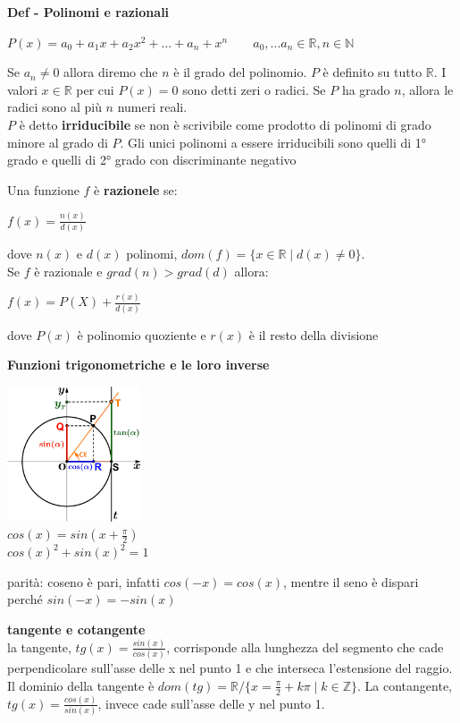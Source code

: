 \documentclass[12pt, a4paper]{article}
\begin{document}
    \textbf{Def - Polinomi e razionali}
    \begin{center}
        $P(x) = a_{0}+a_{1}x+a_{2}x^{2}+...+a_{n}+x^{n} \qquad a_{0},...a_{n}\in\mathbb{R},  n\in\mathbb{N}$
    \end{center}
    Se $a_{n}\neq 0$ allora diremo che $n$ è il grado del polinomio. $P$ è definito su tutto $\mathbb{R}$.
    I valori $x\in\mathbb{R}$ per cui $P(x)=0$ sono detti zeri o radici. Se $P$ ha grado $n$, allora le radici sono
    al più $n$ numeri reali.\\$P$ è detto \textbf{irriducibile} se non è scrivibile come prodotto di polinomi di grado
minore al grado di $P$. Gli unici polinomi a essere irriducibili sono quelli di 1° grado e quelli di 2° grado con
discriminante negativo

Una funzione $f$ è \textbf{razionele} se:
\begin{center}
    $f(x)=\frac{n(x)}{d(x)}$
\end{center}
dove $n(x)$ e $d(x)$ polinomi, $dom(f)=\{x\in\mathbb{R}\mid d(x)\neq 0\}$.\\Se $f$ è razionale e $grad(n)>grad(d)$
allora:
\begin{center}
    $f(x)=P(X)+\frac{r(x)}{d(x)}$
\end{center}
dove $P(x)$ è polinomio quoziente e $r(x)$ è il resto della divisione

\textbf{Funzioni trigonometriche e le loro inverse}
\begin{center}
    \includegraphics[width=150px]{images/trigon.png}\\
    $cos(x)=sin(x+\frac{\pi}{2})$\\
    $cos(x)^{2}+sin(x)^{2}=1$
\end{center}
parità: coseno è pari, infatti $cos(-x)=cos(x)$, mentre il seno è dispari perché $sin(-x)=-sin(x)$

\textbf{tangente e cotangente}\\la tangente, $tg(x)=\frac{sin(x)}{cos(x)}$, corrisponde alla lunghezza del segmento
che cade perpendicolare sull'asse delle x nel punto 1 e che interseca l'estensione del raggio. Il dominio della
tangente è $dom(tg)=\mathbb{R}/\{x=\frac{\pi}{2}+k\pi\mid k\in\mathbb{Z}\}$. La contangente,
$tg(x)=\frac{cos(x)}{sin(x)}$, invece cade sull'asse delle y nel punto 1.
\end{document}
